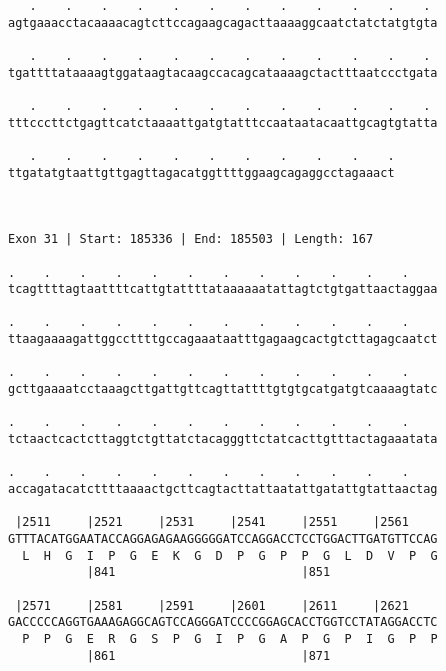 \documentclass{article}
\begin{document}
\begin{Verbatim}
   .    .    .    .    .    .    .    .    .    .    .    . 
agtgaaacctacaaaacagtcttccagaagcagacttaaaaggcaatctatctatgtgta
                                                            
   .    .    .    .    .    .    .    .    .    .    .    . 
tgattttataaaagtggataagtacaagccacagcataaaagctactttaatccctgata
                                                            
   .    .    .    .    .    .    .    .    .    .    .    . 
tttcccttctgagttcatctaaaattgatgtatttccaataatacaattgcagtgtatta
                                                            
   .    .    .    .    .    .    .    .    .    .    .
ttgatatgtaattgttgagttagacatggttttggaagcagaggcctagaaact
                                                      
                                                      
 
Exon 31 | Start: 185336 | End: 185503 | Length: 167
 
.    .    .    .    .    .    .    .    .    .    .    .    
tcagttttagtaattttcattgtattttataaaaaatattagtctgtgattaactaggaa
                                                            
.    .    .    .    .    .    .    .    .    .    .    .    
ttaagaaaagattggccttttgccagaaataatttgagaagcactgtcttagagcaatct
                                                            
.    .    .    .    .    .    .    .    .    .    .    .    
gcttgaaaatcctaaagcttgattgttcagttattttgtgtgcatgatgtcaaaagtatc
                                                            
.    .    .    .    .    .    .    .    .    .    .    .    
tctaactcactcttaggtctgttatctacagggttctatcacttgtttactagaaatata
                                                            
.    .    .    .    .    .    .    .    .    .    .    .    
accagatacatcttttaaaactgcttcagtacttattaatattgatattgtattaactag
                                                            
 |2511     |2521     |2531     |2541     |2551     |2561    
GTTTACATGGAATACCAGGAGAGAAGGGGGATCCAGGACCTCCTGGACTTGATGTTCCAG
  L  H  G  I  P  G  E  K  G  D  P  G  P  P  G  L  D  V  P  G
           |841                          |851               
  
 |2571     |2581     |2591     |2601     |2611     |2621    
GACCCCCAGGTGAAAGAGGCAGTCCAGGGATCCCCGGAGCACCTGGTCCTATAGGACCTC
  P  P  G  E  R  G  S  P  G  I  P  G  A  P  G  P  I  G  P  P
           |861                          |871               
  

\end{Verbatim}
\end{document}
